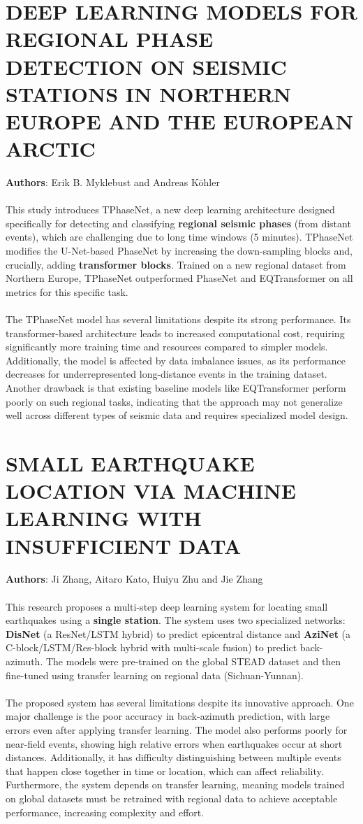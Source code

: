 \documentclass[a4paper,12pt]{report}
\begin{document}
\section{DEEP LEARNING MODELS FOR REGIONAL PHASE DETECTION ON SEISMIC STATIONS IN NORTHERN EUROPE AND THE EUROPEAN ARCTIC}
\label{sec:2.10}
\textbf{Authors}: Erik B. Myklebust and Andreas Köhler\\
\\
This study introduces TPhaseNet, a new deep learning architecture designed specifically for detecting and classifying \textbf{regional seismic phases} (from distant events), which are challenging due to long time windows (5 minutes). TPhaseNet modifies the U-Net-based PhaseNet by increasing the down-sampling blocks and, crucially, adding \textbf{transformer blocks}. Trained on a new regional dataset from Northern Europe, TPhaseNet outperformed PhaseNet and EQTransformer on all metrics for this specific task.
\\
\\
The TPhaseNet model has several limitations despite its strong performance. Its transformer-based architecture leads to increased computational cost, requiring significantly more training time and resources compared to simpler models. Additionally, the model is affected by data imbalance issues, as its performance decreases for underrepresented long-distance events in the training dataset. Another drawback is that existing baseline models like EQTransformer perform poorly on such regional tasks, indicating that the approach may not generalize well across different types of seismic data and requires specialized model design.

\section{SMALL EARTHQUAKE LOCATION VIA MACHINE LEARNING WITH INSUFFICIENT DATA}
\label{sec:2.11}
\textbf{Authors}: Ji Zhang, Aitaro Kato, Huiyu Zhu and Jie Zhang\\
\\
This research proposes a multi-step deep learning system for locating small earthquakes using a \textbf{single station}. The system uses two specialized networks: \textbf{DisNet} (a ResNet/LSTM hybrid) to predict epicentral distance and \textbf{AziNet} (a C-block/LSTM/Res-block hybrid with multi-scale fusion) to predict back-azimuth. The models were pre-trained on the global STEAD dataset and then fine-tuned using transfer learning on regional data (Sichuan-Yunnan).
\\
\\
The proposed system has several limitations despite its innovative approach. One major challenge is the poor accuracy in back-azimuth prediction, with large errors even after applying transfer learning. The model also performs poorly for near-field events, showing high relative errors when earthquakes occur at short distances. Additionally, it has difficulty distinguishing between multiple events that happen close together in time or location, which can affect reliability. Furthermore, the system depends on transfer learning, meaning models trained on global datasets must be retrained with regional data to achieve acceptable performance, increasing complexity and effort.
\end{document}
